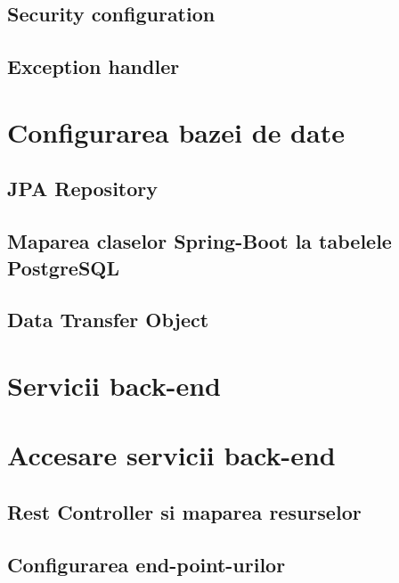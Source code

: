 \documentclass[12pt,a4paper]{report}
\theoremstyle{definition}
\theoremstyle{remark}
\begin{document}
\subsection{Security configuration}

\subsection{Exception handler}

\newpage

\section{Configurarea bazei de date}

\subsection{JPA Repository}

\subsection{Maparea claselor Spring-Boot la tabelele PostgreSQL}

\subsection{Data Transfer Object}

\newpage

\section{Servicii back-end}

\newpage

\section{Accesare servicii back-end}

\subsection{Rest Controller si maparea resurselor}

\subsection{Configurarea end-point-urilor}
\end{document}
